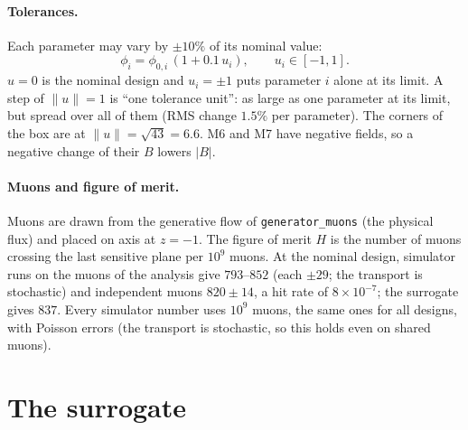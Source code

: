 \documentclass[11pt,a4paper]{article}
\begin{document}
\paragraph{Tolerances.}
Each parameter may vary by $\pm10\%$ of its nominal value:
\begin{equation}
  \phi_i = \phi_{0,i}\,(1 + 0.1\,u_i), \qquad u_i\in[-1,1].
\end{equation}
$u=0$ is the nominal design and $u_i=\pm1$ puts parameter $i$ alone at its limit. A step of
$\|u\|=1$ is ``one tolerance unit'': as large as one parameter at its limit, but spread over all
of them (RMS change $1.5\%$ per parameter). The corners of the box are at $\|u\|=\sqrt{43}=6.6$.
M6 and M7 have negative fields, so a negative change of their $B$ lowers $|B|$.

\paragraph{Muons and figure of merit.}
Muons are drawn from the generative flow of \texttt{generator\_muons} (the physical flux) and
placed on axis at $z=-1$. The figure of merit $H$ is the number of muons crossing the last
sensitive plane per $10^9$ muons. At the nominal design, simulator runs on the muons of the
analysis give $793$--$852$ (each $\pm29$; the transport is stochastic) and independent muons
$820\pm14$, a hit rate of $8\times10^{-7}$; the surrogate gives $837$. Every simulator number uses $10^9$ muons, the same ones for all designs, with
Poisson errors (the transport is stochastic, so this holds even on shared muons).

\section{The surrogate}
\end{document}
